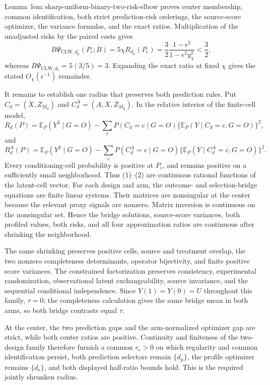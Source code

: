 Lemma~\(\mathrm{lem{:}sharp\text{-}uniform\text{-}binary\text{-}two\text{-}risk\text{-}elbow}\) proves center membership, common identification, both strict prediction-risk orderings, the source-score optimizer, the variance formulas, and the exact ratios.  Multiplication of the unadjusted risks by the paired costs gives
\[
 B\Psi_{\mathrm{CLW},d_{\mathrm p}}(P_\epsilon;B)
 =5\chi R_{d_{\mathrm p}}(P_\epsilon)
 =\frac32\frac{1-\epsilon^2}{1-\epsilon^2y_\chi^2}<\frac32,
\]
whereas \(B\Psi_{\mathrm{CLW},d_{\mathrm e}}=5(3/5)=3\).  Expanding the exact ratio at fixed \(\chi\) gives the stated \(O_\chi(\epsilon^{-1})\) remainder.

It remains to establish one radius that preserves both prediction rules.  Put \(C_d=(X,Z_{M_d})\) and \(C_d^A=(A,X,Z_{M_d})\).  In the relative interior of the finite-cell model,
\[
 R_d(P)=\mathbb E_P(Y^2\mid G=O)
 -\sum_c P(C_d=c\mid G=O)\{\mathbb E_P(Y\mid C_d=c,G=O)\}^2,                 \tag{1}
\]
and
\[
 R_d^A(P)=\mathbb E_P(Y^2\mid G=O)
 -\sum_c P(C_d^A=c\mid G=O)\{\mathbb E_P(Y\mid C_d^A=c,G=O)\}^2.             \tag{2}
\]
Every conditioning-cell probability is positive at \(P_\epsilon\), and remains positive on a sufficiently small neighborhood.  Thus (1)--(2) are continuous rational functions of the latent-cell vector.  For each design and arm, the outcome- and selection-bridge equations are finite linear systems.  Their matrices are nonsingular at the center because the relevant proxy signals are nonzero.  Matrix inversion is continuous on the nonsingular set.  Hence the bridge solutions, source-score variances, both profiled values, both risks, and all four approximation ratios are continuous after shrinking the neighborhood.

The same shrinking preserves positive cells, source and treatment overlap, the two nonzero completeness determinants, operator bijectivity, and finite positive score variances.  The constrained factorization preserves consistency, experimental randomization, observational latent exchangeability, source invariance, and the sequential conditional independence.  Since \(Y(1)=Y(0)=U\) throughout this family, \(\tau=0\); the completeness calculation gives the same bridge mean in both arms, so both bridge contrasts equal \(\tau\).

At the center, the two prediction gaps and the arm-normalized optimizer gap are strict, while both center ratios are positive.  Continuity and finiteness of the two-design family therefore furnish a common \(r_\epsilon>0\) on which regularity and common identification persist, both prediction selectors remain \(\{d_{\mathrm p}\}\), the profile optimizer remains \(\{d_{\mathrm e}\}\), and both displayed half-ratio bounds hold.  This is the required jointly shrunken radius.